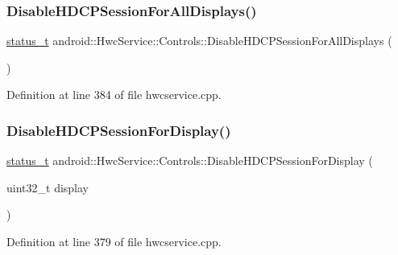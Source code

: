 \subsubsection{\texorpdfstring{Disable\+H\+D\+C\+P\+Session\+For\+All\+Displays()}{DisableHDCPSessionForAllDisplays()}}
{\footnotesize\ttfamily \mbox{\hyperlink{hwcserviceapi_8h_a3806fb2027d9a316d8ca8d9b8b8eb96f}{status\+\_\+t}} android\+::\+Hwc\+Service\+::\+Controls\+::\+Disable\+H\+D\+C\+P\+Session\+For\+All\+Displays (\begin{DoxyParamCaption}{ }\end{DoxyParamCaption})}



Definition at line 384 of file hwcservice.\+cpp.


\begin{DoxyCode}{0}
\end{DoxyCode}
\mbox{\label{classandroid_1_1HwcService_1_1Controls_a7dcb46dcf375714e13431a237b82374f}} 
\subsubsection{\texorpdfstring{Disable\+H\+D\+C\+P\+Session\+For\+Display()}{DisableHDCPSessionForDisplay()}}
{\footnotesize\ttfamily \mbox{\hyperlink{hwcserviceapi_8h_a3806fb2027d9a316d8ca8d9b8b8eb96f}{status\+\_\+t}} android\+::\+Hwc\+Service\+::\+Controls\+::\+Disable\+H\+D\+C\+P\+Session\+For\+Display (\begin{DoxyParamCaption}\item[{uint32\+\_\+t}]{display }\end{DoxyParamCaption})}



Definition at line 379 of file hwcservice.\+cpp.



